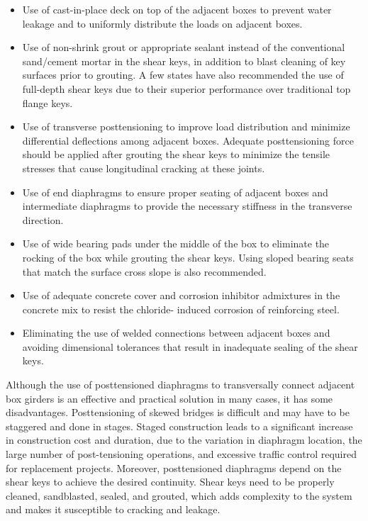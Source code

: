 \begin{itemize}
  \item  Use of cast-in-place deck on top of the adjacent boxes to prevent water leakage and to uniformly distribute
  the loads on adjacent boxes.
  \item Use of non-shrink grout or appropriate sealant instead of the conventional sand/cement mortar in the shear
  keys, in addition to blast cleaning of key surfaces prior to grouting. A few states have also recommended the
  use of full-depth shear keys due to their superior performance over traditional top flange keys.
  \item Use of transverse posttensioning to improve load distribution and minimize differential deflections among
  adjacent boxes. Adequate posttensioning force should be applied after grouting the shear keys to minimize
  the tensile stresses that cause longitudinal cracking at these joints.
  \item Use of end diaphragms to ensure proper seating of adjacent boxes and intermediate diaphragms to provide
  the necessary stiffness in the transverse direction.
  \item Use of wide bearing pads under the middle of the box to eliminate the rocking of the box while grouting the
  shear keys. Using sloped bearing seats that match the surface cross slope is also recommended.
  \item Use of adequate concrete cover and corrosion inhibitor admixtures in the concrete mix to resist the chloride-
  induced corrosion of reinforcing steel.
  \item Eliminating the use of welded connections between adjacent boxes and avoiding dimensional tolerances that
  result in inadequate sealing of the shear keys.
\end{itemize}
Although the use of posttensioned diaphragms to transversally connect adjacent box girders is an effective and
practical solution in many cases, it has some disadvantages. Posttensioning of skewed bridges is difficult and may
have to be staggered and done in stages. Staged construction leads to a significant increase in construction cost and
duration, due to the variation in diaphragm location, the large number of post-tensioning operations, and excessive
traffic control required for replacement projects. Moreover, posttensioned diaphragms depend on the shear keys to
achieve the desired continuity. Shear keys need to be properly cleaned, sandblasted, sealed, and grouted, which adds
complexity to the system and makes it susceptible to cracking and leakage.

